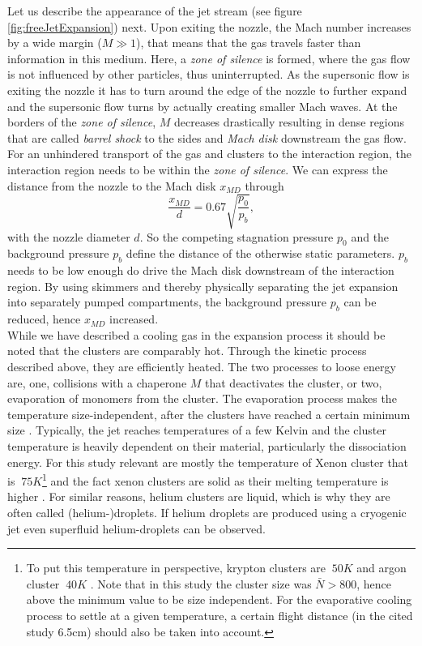 Let us describe the appearance of the jet stream (see figure \ref{fig:freeJetExpansion}) next. Upon exiting the nozzle, the Mach number increases by a wide margin ($M\gg 1$), that means that the gas travels faster than information in this medium. Here, a \textit{zone of silence} is formed, where the gas flow is not influenced by other particles, thus uninterrupted. As the supersonic flow is exiting the nozzle it has to turn around the edge of the nozzle to further expand and the supersonic flow turns by actually creating smaller Mach waves. At the borders of the \textit{zone of silence}, $M$ decreases drastically resulting in dense regions that are called \textit{barrel shock} to the sides and \textit{Mach disk} downstream the gas flow. For an unhindered transport of the gas and clusters to the interaction region, the interaction region needs to be within the \textit{zone of silence}. We can express the distance from the nozzle to the Mach disk $x_{MD}$ through
\begin{equation}
\frac{x_{MD}}{d}=0.67\sqrt{\frac{p_{0}}{p_{b}}},
\label{eq:distance-of-mach-disk}
\end{equation}
with the nozzle diameter $d$. So the competing stagnation pressure $p_{0}$ and the background pressure $p_{b}$ define the distance of the otherwise static parameters. $p_{b}$ needs to be low enough do drive the Mach disk downstream of the interaction region. By using skimmers and thereby physically separating the jet expansion into separately pumped compartments, the background pressure $p_{b}$ can be reduced, hence $x_{MD}$ increased.\\
While we have described a cooling gas in the expansion process it should be noted that the clusters are comparably hot. Through the kinetic process described above, they are efficiently heated. The two processes to loose energy are, one, collisions with a chaperone $M$ that deactivates the cluster, or two, evaporation of monomers from the cluster. The evaporation process makes the temperature size-independent, after the clusters have reached a certain minimum size \cite{Farges-1981-SurfSci}. Typically, the jet reaches temperatures of a few Kelvin and the cluster temperature is heavily dependent on their material, particularly the dissociation energy. For this study relevant are mostly the temperature of Xenon cluster that is $~75K$\footnote{To put this temperature in perspective, krypton clusters are $~50K$ and argon cluster $~40K$ \citep{Farges-1981-SurfSci,Gspann-1986-Springer}. Note that in this study the cluster size was $\bar{N} > 800$, hence above the minimum value to be size independent. For the evaporative cooling process to settle at a given temperature, a certain flight distance (in the cited study 6.5cm) should also be taken into account.} and the fact xenon clusters are solid as their melting temperature is higher \cite{Gspann-1986-Springer}. For similar reasons, helium clusters are liquid, which is why they are often called (helium-)droplets. If helium droplets are produced using a cryogenic jet even superfluid helium-droplets can be observed.\\
